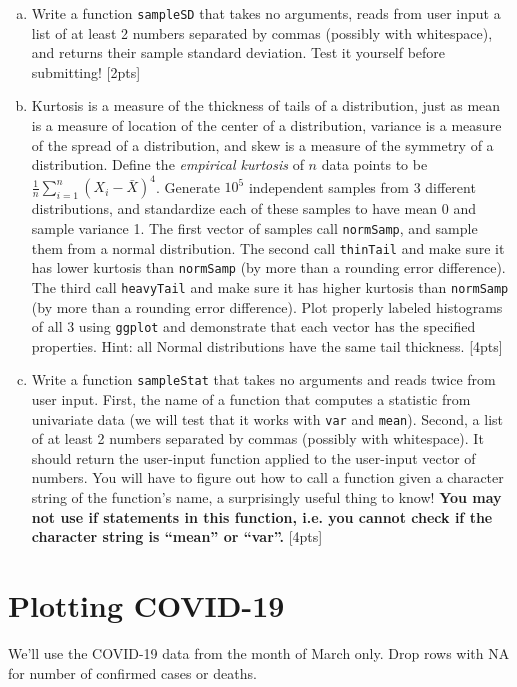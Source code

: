 \documentclass[12pt]{article}
\begin{document}
\begin{enumerate}[(a)]
	\item Write a function \verb|sampleSD| that takes no arguments, reads from user input a list of at least 2 numbers separated by commas (possibly with whitespace), and returns their sample standard deviation. Test it yourself before submitting! [2pts]
	\item Kurtosis is a measure of the thickness of tails of a distribution, just as mean is a measure of location of the center of a distribution, variance is a measure of the spread of a distribution, and skew is a measure of the symmetry of a distribution. Define the \textit{empirical kurtosis} of $n$ data points to be $\frac{1}{n} \sum_{i=1}^n (X_i - \bar{X})^4$. Generate $10^5$ independent samples from 3 different distributions, and standardize each of these samples to have mean 0 and sample variance 1. The first vector of samples call \verb|normSamp|, and sample them from a normal distribution. The second call \verb|thinTail| and make sure it has lower kurtosis than \verb|normSamp| (by more than a rounding error difference). The third call \verb|heavyTail| and make sure it has higher kurtosis than \verb|normSamp| (by more than a rounding error difference). Plot properly labeled histograms of all 3 using \verb|ggplot| and demonstrate that each vector has the specified properties. Hint: all Normal distributions have the same tail thickness. [4pts]
	\item Write a function \verb|sampleStat| that takes no arguments and reads twice from user input. First, the name of a function that computes a statistic from univariate data (we will test that it works with \verb|var| and \verb|mean|). Second, a list of at least 2 numbers separated by commas (possibly with whitespace). It should return the user-input function applied to the user-input vector of numbers. You will have to figure out how to call a function given a character string of the function's name, a surprisingly useful thing to know! \textbf{You may not use if statements in this function, i.e. you cannot check if the character string is ``mean'' or ``var''.} [4pts]
\end{enumerate}

\section{Plotting COVID-19}

We'll use the COVID-19 data from the month of March only. Drop rows with NA for number of confirmed cases or deaths.
\end{document}
